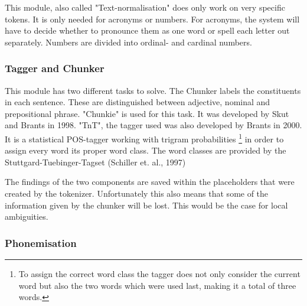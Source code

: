 \documentclass[a4paper, 12pt]{article}
\begin{document}
This module, also called "Text-normalisation" does only work on very specific tokens.
It is only needed for acronyms or numbers.
For acronyms, the system will have to decide whether to pronounce them as one word or spell each letter out separately.
Numbers are divided into ordinal- and cardinal numbers.

\subsubsection*{Tagger and Chunker}

This module has two different tasks to solve. 
The Chunker labels the constituents in each sentence.
These are distinguished between adjective, nominal and prepositional phrase. "Chunkie" is used for this task. 
It was developed by Skut and Brants in 1998. 
"TnT", the tagger used was also developed by Brants in 2000. 
It is a statistical POS-tagger working with trigram probabilities \footnote {To assign the correct word class the tagger does not only consider the current word but also the two words which were used last, making it a total of three words.} in order to assign every word its proper word class.
The word classes are provided by the Stuttgard-Tuebinger-Tagset (Schiller et. al., 1997)

The findings of the two components are saved within the placeholders that were created by the tokenizer.
Unfortunately this also means that some of the information given by the chunker will be lost. This would be the case for local ambiguities.


\subsubsection*{Phonemisation}
\end{document}
